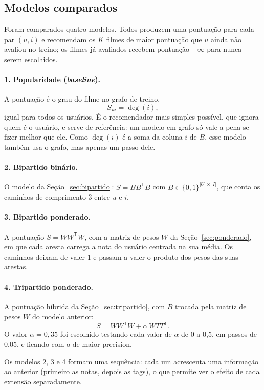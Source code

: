 \documentclass[12pt,a4paper]{article}
\theoremstyle{definition}
\begin{document}
\subsection{Modelos comparados}\label{sec:modelos}

Foram comparados quatro modelos. Todos produzem uma pontuação para cada par
$(u, i)$ e recomendam os $K$ filmes de maior pontuação que $u$ ainda não
avaliou no treino; os filmes já avaliados recebem pontuação $-\infty$
para nunca serem escolhidos.

\paragraph{1. Popularidade (\emph{baseline}).}
A pontuação é o grau do filme no grafo de treino,
\[
  S_{ui} = \deg(i),
\]
igual para todos os usuários. É o recomendador mais simples possível, que
ignora quem é o usuário, e serve de referência: um modelo em grafo só vale
a pena se fizer melhor que ele. Como $\deg(i)$ é a soma da coluna $i$ de
$B$, esse modelo também usa o grafo, mas apenas um passo dele.

\paragraph{2. Bipartido binário.}
O modelo da Seção~\ref{sec:bipartido}: $S = BB^{\mathsf T}B$ com
$B \in \{0,1\}^{|U| \times |I|}$, que conta os caminhos de comprimento 3
entre $u$ e $i$.

\paragraph{3. Bipartido ponderado.}
A pontuação $S = WW^{\mathsf T}W$, com a matriz de pesos $W$ da
Seção~\ref{sec:ponderado}, em que cada aresta carrega a nota do usuário
centrada na sua média. Os caminhos deixam de valer 1 e passam a valer o
produto dos pesos das suas arestas.

\paragraph{4. Tripartido ponderado.}
A pontuação híbrida da Seção~\ref{sec:tripartido}, com $B$ trocada pela
matriz de pesos $W$ do modelo anterior:
\[
  S = WW^{\mathsf T}W + \alpha\, WTT^{\mathsf T}.
\]
O valor $\alpha = 0{,}35$ foi escolhido testando cada valor de $\alpha$ de 0 a 0{,}5, em passos de 0{,}05, e ficando com o de maior precision.

\medskip
Os modelos 2, 3 e 4 formam uma sequência: cada um acrescenta uma
informação ao anterior (primeiro as notas, depois as tags), o que permite
ver o efeito de cada extensão separadamente.
\end{document}

